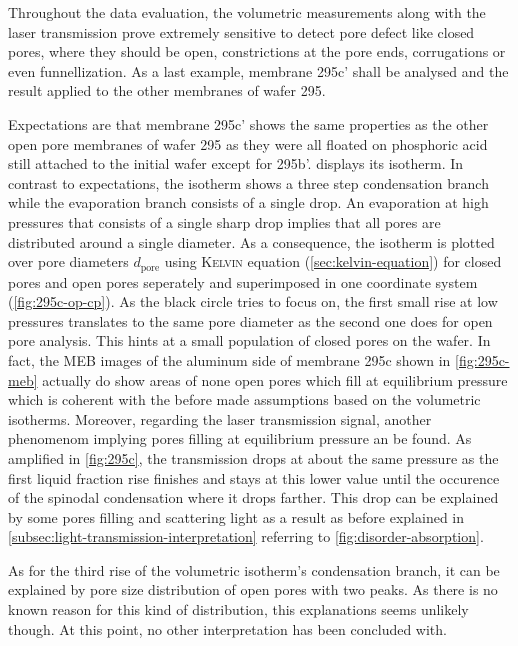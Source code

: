 \documentclass[../thesis.tex]{subfiles}
\begin{document}
            Throughout the data evaluation, the volumetric measurements along with the laser transmission prove extremely sensitive to detect pore defect like closed pores, where they should be open, constrictions at the pore ends, corrugations or even funnellization. As a last example, membrane 295c' shall be analysed and the result applied to the other membranes of wafer 295.

            Expectations are that membrane 295c' shows the same properties as the other open pore membranes of wafer 295 as they were all floated on phosphoric acid still attached to the initial wafer except for 295b'.  displays its isotherm. In contrast to expectations, the isotherm shows a three step condensation branch while the evaporation branch consists of a single drop. An evaporation at high pressures that consists of a single sharp drop implies that all pores are distributed around a single diameter. As a consequence, the isotherm is plotted over pore diameters $d_\mathrm{pore}$ using \textsc{Kelvin} equation (\cref{sec:kelvin-equation}) for closed pores and open pores seperately and superimposed in one coordinate system (\cref{fig:295c-op-cp}). As the black circle tries to focus on, the first small rise at low pressures translates to the same pore diameter as the second one does for open pore analysis. This hints at a small population of closed pores on the wafer. In fact, the MEB images of the aluminum side of membrane 295c shown in \cref{fig:295c-meb} actually do show areas of none open pores which fill at equilibrium pressure which is coherent with the before made assumptions based on the volumetric isotherms. Moreover, regarding the laser transmission signal, another phenomenom implying pores filling at equilibrium pressure an be found. As amplified in \cref{fig:295c}, the transmission drops at about the same pressure as the first liquid fraction rise finishes and stays at this lower value until the occurence of the spinodal condensation where it drops farther. This drop can be explained by some pores filling and scattering light as a result as before explained in \cref{subsec:light-transmission-interpretation} referring to \cref{fig:disorder-absorption}.

            As for the third rise of the volumetric isotherm's condensation branch, it can be explained by pore size distribution of open pores with two peaks. As there is no known reason for this kind of distribution, this explanations seems unlikely though. At this point, no other interpretation has been concluded with.
\end{document}
